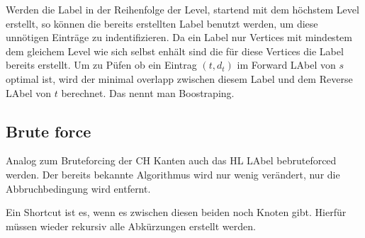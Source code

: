 Werden die Label in der Reihenfolge der Level, startend mit dem höchstem Level erstellt, so können die bereits erstellten Label benutzt werden, um diese unnötigen Einträge zu indentifizieren.
Da ein Label nur Vertices mit mindestem dem gleichem Level wie sich selbst enhält sind die für diese Vertices die Label bereits erstellt.
Um zu Püfen ob ein Eintrag $(t, d_t)$ im Forward LAbel von $s$ optimal ist, wird der minimal overlapp zwischen diesem Label und dem Reverse LAbel von $t$ berechnet.
Das nennt man Boostraping.

\subsection{Brute force}

Analog zum Bruteforcing der CH Kanten auch das HL LAbel bebruteforced werden.
Der bereits bekannte Algorithmus wird nur wenig verändert, nur die Abbruchbedingung wird entfernt.


Ein Shortcut ist es, wenn es zwischen diesen beiden noch Knoten gibt.
Hierfür müssen wieder rekursiv alle Abkürzungen erstellt werden.